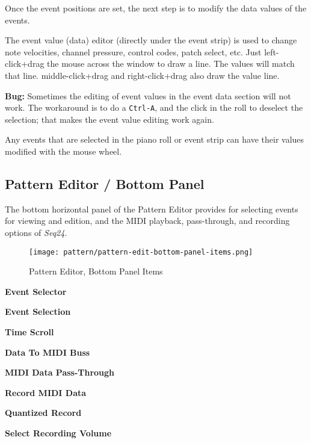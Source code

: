    Once the event positions are set, the next step is to modify the
   data values of the events.

	The event value (data) editor (directly under the event strip) is used 
	to change note velocities, channel pressure, control codes,
	patch select, etc.
   Just left-click+drag the mouse across the window to draw a line.  The
   values will match that line.  
   middle-click+drag and right-click+drag also
   draw the value line.

   \textbf{Bug:}
   Sometimes the editing of event values in the event data section will not work.
   The workaround is to do a \texttt{Ctrl-A}, and the click in the roll
   to deselect the selection; that makes the event value editing work again.
   
   Any events that are selected in the piano roll or event strip can have
   their values modified with the mouse wheel.

\subsection{Pattern Editor / Bottom Panel}
\label{subsec:seq24_pattern_editor_bottom}

   The bottom horizontal panel of the Pattern Editor provides for
   selecting events for viewing and edition, and the MIDI playback,
   pass-through, and recording options of \textsl{Seq24}.

\begin{figure}[H]
   \centering 
   \texttt{[image: pattern/pattern-edit-bottom-panel-items.png]}
   \caption{Pattern Editor, Bottom Panel Items}
   \label{fig:pattern_editor_bottom_panel_items}
\end{figure}

   \begin{enumber}
      \item \textbf{Event Selector}
      \item \textbf{Event Selection}
      \item \textbf{Time Scroll}
      \item \textbf{Data To MIDI Buss}
      \item \textbf{MIDI Data Pass-Through}
      \item \textbf{Record MIDI Data}
      \item \textbf{Quantized Record}
      \item \textbf{Select Recording Volume}
   \end{enumber}

